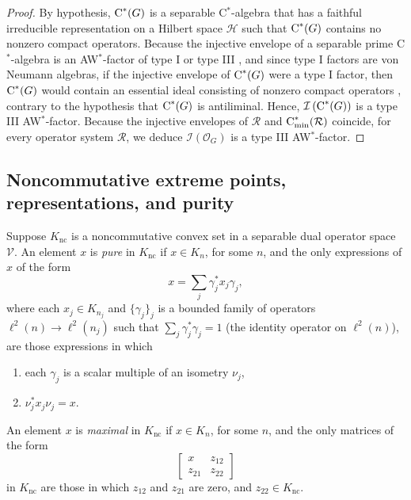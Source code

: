 \documentclass{amsart}
\theoremstyle{definition}
\theoremstyle{remark}
\renewcommand{\H}{\mathcal{H}}
\newcommand\osr{{\mathcal R}}
\newcommand\cstar{{\textrm C}^*}                              %
\newcommand\cstare{{\textrm C}_{\textrm{min}}^*}              %
\numberwithin{equation}{section}
\begin{document}
\begin{proof} By hypothesis, $\cstar(G)$ is a separable C$^*$-algebra that has a faithful irreducible representation on a Hilbert space $\H$ such that $\cstar(G)$ contains no nonzero
compact operators. Because the injective envelope of a separable prime C$^*$-algebra is an AW$^*$-factor of type I or type III \cite[Corollary 2.4]{argerami--farenick2008}, and
since type I factors are von Neumann algebras, if the injective envelope of $\cstar(G)$ were a type I factor, then $\cstar(G)$ would contain an essential ideal consisting of nonzero
compact operators \cite{argerami--farenick2008}, contrary to the hypothesis that $\cstar(G)$ is antiliminal. Hence, $\mathcal I\left(\cstar(G)\right)$ is
a type III AW$^*$-factor. Because the injective envelopes of $\osr$ and $\cstare(\osr)$ coincide, for every operator system $\osr$, we deduce 
$\mathcal I\left(\mathcal O_G\right)$ is
a type III AW$^*$-factor.
\end{proof}


\subsection{Noncommutative extreme points, representations, and purity}

Suppose $K_{\textrm{nc}}$ is a noncommutative convex set in a separable dual operator space $\mathcal V$. 
An element $x$ is \emph{pure} in $K_{\textrm{nc}}$ if $x\in K_n$, for some $n$, and the only expressions
of $x$ of the form
\[
x=\sum_j \gamma_j^* x_j \gamma_j,
\]
where each $x_j\in K_{n_j}$ and $\{\gamma_j\}_j$ is a bounded family of operators $\ell^2(n)\rightarrow\ell^2(n_j)$
such that $\displaystyle\sum_j \gamma_j^*  \gamma_j = 1$ (the identity operator on $\ell^2(n)$),
are those expressions in which 
\begin{enumerate}
\item each $\gamma_j$ is a scalar multiple of an isometry $\nu_j$, 
\item $\nu_j^*x_j\nu_j=x$. 
\end{enumerate}

An element $x$ is \emph{maximal} in $K_{\textrm{nc}}$ if $x\in K_n$, for some $n$, and the only matrices of the form
\[
\left[ \begin{array}{cc} x & z_{12} \\ z_{21} & z_{22} \end{array}\right] 
\]
in $K_{\textrm{nc}}$ are those in which $z_{12}$ and $z_{21}$ are zero, and $z_{22}\in K_{\textrm{nc}}$.
\end{document}
